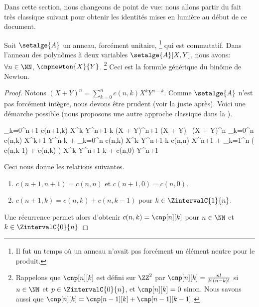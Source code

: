 Dans cette section, nous changeons de point de vue: nous allons partir du fait très classique suivant pour obtenir les identités mises en lumière au début de ce document.




\begin{fact} \label{bino-id-formal}
	Soit $\setalge{A}$ un anneau, forcément unitaire,%
	\footnote{
        Il fut un temps où un anneau n'avait pas forcément un élément neutre pour le produit.
	}
	qui est commutatif.
	Dans l'anneau des polynômes à deux variables $\setalge{A}[X, Y]$, nous avons:
	$\forall n \in \NN$,
	$\cnpnewton{X}{Y}$.%
	\footnote{
        Rappelons que $\cnp[n][k]$ est défini sur $\ZZ^2$ par
        $\cnp[n][k] = \frac{n!}{k!(n-k)!}$ si $n \in \NN$ et $p \in \ZintervalC{0}{n}$,
        et
        $\cnp[n][k] = 0$ sinon.
        Nous savons aussi que $\cnp[n][k] = \cnp[n-1][k] + \cnp[n-1][k-1]$.
	}
	Ceci est la formule générique du binôme de Newton.
\end{fact}


\begin{proof}
    Notons $(X + Y)^n = \sum_{k=0}^{n} c(n,k) X^k Y^{n-k}$. Comme $\setalge{A}$ n'est pas forcément intègre, nous devons être prudent (voir la  juste après). Voici une démarche possible (nous proposons une autre approche classique dans la ).%

    \begin{stepcalc}[style=ar*]
    	\dsum_{k=0}^{n+1} c(n+1,k) X^k Y^{n+1-k}
	\explnext{}
		(X + Y)^{n+1}
	\explnext{}
		(X + Y) \, (X + Y)^n
	\explnext{}
		  \dsum_{k=0}^{n} c(n,k) X^{k+1} Y^{n-k}
		+ \dsum_{k=0}^{n} c(n,k) X^k     Y^{n+1-k}
	\explnext{}
		  c(n,n) X^{n+1}
		+ \dsum_{k=1}^{n} \big( c(n,k-1) + c(n,k) \big) X^{k} Y^{n+1-k}
		+ c(n,0) Y^{n+1}
    \end{stepcalc}
    
    Ceci nous donne les relations suivantes.
    \begin{enumerate}
    	\item $c(n+1,n+1) = c(n,n)$ et $c(n+1,0) = c(n,0)$.

    	\item $c(n+1,k) = c(n,k) + c(n,k-1)$ pour $k \in \ZintervalC{1}{n}$.
    \end{enumerate}
    
    Une récurrence permet alors d'obtenir
    $c(n,k) = \cnp[n][k]$ pour $n \in \NN$ et $k \in \ZintervalC{0}{n}$
\end{proof}


